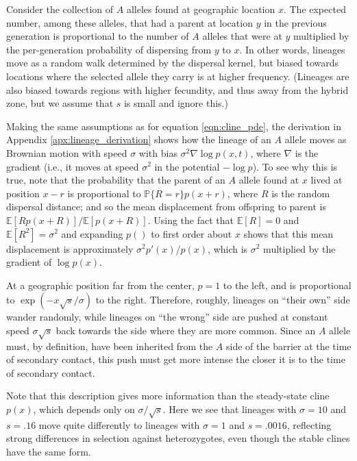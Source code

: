 \documentclass[11pt,letterpaper]{article}
\newcommand{\alisa}[1]{{\em \color{red} #1}}
\newcommand{\E}{\mathbb{E}}
\renewcommand{\P}{\mathbb{P}}
\newcommand{\grad}{\nabla}
\begin{document}
Consider the collection of $A$ alleles found at geographic location $x$.
The expected number, among these alleles, that had a parent at location $y$ in the previous generation 
is proportional to the number of $A$ alleles that were at $y$ multiplied by the per-generation probability of dispersing from $y$ to $x$. 
In other words, lineages move as a random walk determined by the dispersal kernel,
but biased towards locations where the selected allele they carry is at higher frequency.
(Lineages are also biased towards regions with higher fecundity,
and thus away from the hybrid zone, but we assume that $s$ is small and ignore this.)

Making the same assumptions as for equation \eqref{eqn:cline_pde}, the derivation in Appendix \ref{apx:lineage_derivation} shows 
how the lineage of an $A$ allele moves as Brownian motion with speed $\sigma$
with bias $\sigma^2 \grad \log p(x,t)$, where $\grad$ is the gradient
(i.e., it moves at speed $\sigma^2$ in the potential $-\log p$).
To see why this is true, note that the probability that the parent of an $A$ allele found at $x$
lived at position $x-r$ is proportional to $\P\{R=r\} p(x+r)$, where $R$ is the random dispersal distance;
and so the mean displacement from offspring to parent is $\E[R p(x+R)]/\E[p(x+R)]$.
Using the fact that $\E[R]=0$ and $\E[R^2]=\sigma^2$
and expanding $p()$ to first order about $x$ shows that this mean displacement is approximately $\sigma^2 p'(x)/p(x)$,
which is $\sigma^2$ multiplied by the gradient of $\log p(x)$.

At a geographic position far from the center, $p=1$ to the left, and is proportional to  $\exp(-x\sqrt{s}/\sigma)$ to the right.
Therefore, roughly, lineages on ``their own'' side wander randomly,
while lineages on ``the wrong'' side are pushed at constant speed $\sigma\sqrt{s}$ 
back towards the side where they are more common. 
Since an $A$ allele must, by definition, have been inherited from the $A$ side of the barrier 
at the time of secondary contact, this push must get more intense the closer it is to the time of secondary contact.

Note that this description gives more information than the steady-state cline $p(x)$,
which depends only on $\sigma/\sqrt{s}$.
Here we see that lineages with $\sigma=10$ and $s=.16$ move quite differently
to lineages with $\sigma=1$ and $s=.0016$,
reflecting strong differences in selection against heterozygotes,
even though the stable clines have the same form.
\end{document}
